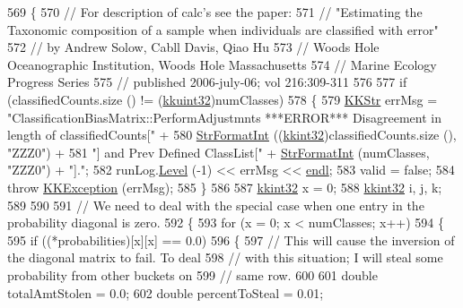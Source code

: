 \begin{DoxyCode}
569 \{
570   \textcolor{comment}{// For description of calc's see the paper: }
571   \textcolor{comment}{//    "Estimating the Taxonomic composition of a sample when individuals are classified with error"}
572   \textcolor{comment}{//     by Andrew Solow, Cabll Davis, Qiao Hu}
573   \textcolor{comment}{//     Woods Hole Oceanographic Institution, Woods Hole Massachusetts}
574   \textcolor{comment}{//     Marine Ecology Progress Series}
575   \textcolor{comment}{//     published 2006-july-06;  vol 216:309-311}
576 
577   \textcolor{keywordflow}{if}  (classifiedCounts.size () != (\hyperlink{namespace_k_k_b_af8d832f05c54994a1cce25bd5743e19a}{kkuint32})numClasses)
578   \{
579     \hyperlink{class_k_k_b_1_1_k_k_str}{KKStr} errMsg = \textcolor{stringliteral}{"ClassificationBiasMatrix::PerformAdjustmnts  ***ERROR***   Disagreement in length
       of classifiedCounts["} + 
580                    \hyperlink{namespace_k_k_b_ae3bde258fa036604fac8bdb0277ab46e}{StrFormatInt} ((\hyperlink{namespace_k_k_b_a8fa4952cc84fda1de4bec1fbdd8d5b1b}{kkint32})classifiedCounts.size (), \textcolor{stringliteral}{"ZZZ0"}) + 
581                    \textcolor{stringliteral}{"]  and Prev Defined ClassList["} + \hyperlink{namespace_k_k_b_ae3bde258fa036604fac8bdb0277ab46e}{StrFormatInt} (numClasses, \textcolor{stringliteral}{"ZZZ0"}) + \textcolor{stringliteral}{"]."};
582     runLog.\hyperlink{class_k_k_b_1_1_run_log_a32cf761d7f2e747465fd80533fdbb659}{Level} (-1) << errMsg << \hyperlink{namespace_k_k_b_ad1f50f65af6adc8fa9e6f62d007818a8}{endl};
583     valid = \textcolor{keyword}{false};
584     \textcolor{keywordflow}{throw} \hyperlink{class_k_k_b_1_1_k_k_exception}{KKException} (errMsg);
585   \}
586 
587   \hyperlink{namespace_k_k_b_a8fa4952cc84fda1de4bec1fbdd8d5b1b}{kkint32} x = 0;
588   \hyperlink{namespace_k_k_b_a8fa4952cc84fda1de4bec1fbdd8d5b1b}{kkint32}  i, j, k;
589 
590 
591   \textcolor{comment}{// We need to deal with the special case when one entry in the probability diagonal is zero.}
592   \{
593     \textcolor{keywordflow}{for} (x = 0;  x < numClasses;  x++)
594     \{
595       \textcolor{keywordflow}{if}  ((*probabilities)[x][x] == 0.0)
596       \{
597         \textcolor{comment}{// This will cause the inversion of the diagonal matrix to fail.  To deal}
598         \textcolor{comment}{// with this situation; I will steal some probability from other buckets on }
599         \textcolor{comment}{// same row.}
600 
601         \textcolor{keywordtype}{double}  totalAmtStolen = 0.0;
602         \textcolor{keywordtype}{double}  percentToSteal = 0.01;

\end{DoxyCode}
